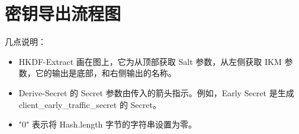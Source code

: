 \section{密钥导出流程图}



几点说明：

\begin{itemize}
  \item HKDF-Extract 画在图上，它为从顶部获取 Salt 参数，从左侧获取 IKM 参数，它的输出是底部，和右侧输出的名称。
  \item Derive-Secret 的 Secret 参数由传入的箭头指示。例如，Early Secret 是生成 client\_early\_traffic\_secret 的 Secret。
  \item "0" 表示将 Hash.length 字节的字符串设置为零。
\end{itemize}

\newpage